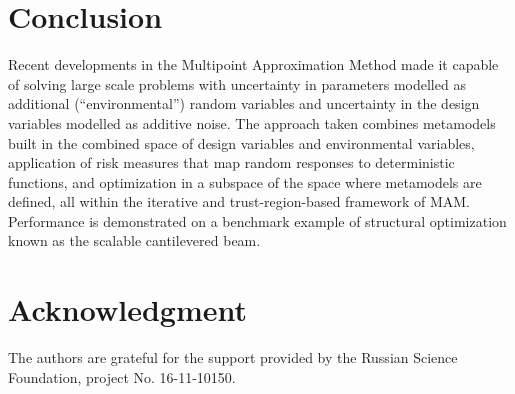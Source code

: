 \documentclass{llncs}
\begin{document}
\section{Conclusion}
\label{sec:conclusion}

Recent developments in the Multipoint Approximation Method made it capable of solving large scale problems with uncertainty in parameters modelled as additional (``environmental'') random variables and uncertainty in the design variables modelled as additive noise. The approach taken combines metamodels built in the combined space of design variables and environmental variables, application of risk measures that map random responses to deterministic functions, and optimization in a subspace of the space where metamodels are defined, all within the iterative and trust-region-based framework of MAM. Performance is demonstrated on a benchmark example of structural optimization known as the scalable cantilevered beam.

\section*{Acknowledgment}
The authors are grateful for the support provided by the Russian Science Foundation, project No. 16-11-10150.

%
\end{document}
